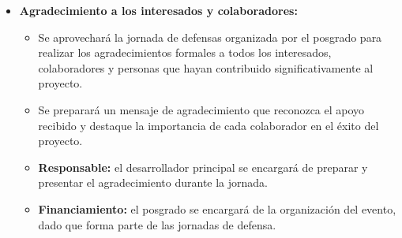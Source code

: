 \documentclass[
11pt, %
]{charter}
\begin{document}
\begin{itemize}
    \item \textbf{Agradecimiento a los interesados y colaboradores:}
    \begin{itemize}
        \item Se aprovechará la jornada de defensas organizada por el posgrado para realizar los agradecimientos formales a todos los interesados, colaboradores y personas que hayan contribuido significativamente al proyecto.
        \item Se preparará un mensaje de agradecimiento que reconozca el apoyo recibido y destaque la importancia de cada colaborador en el éxito del proyecto.
        \item \textbf{Responsable:} el desarrollador principal se encargará de preparar y presentar el agradecimiento durante la jornada.
        \item \textbf{Financiamiento:} el posgrado se encargará de la organización del evento, dado que forma parte de las jornadas de defensa.
    \end{itemize}
\end{itemize}
\end{document}
